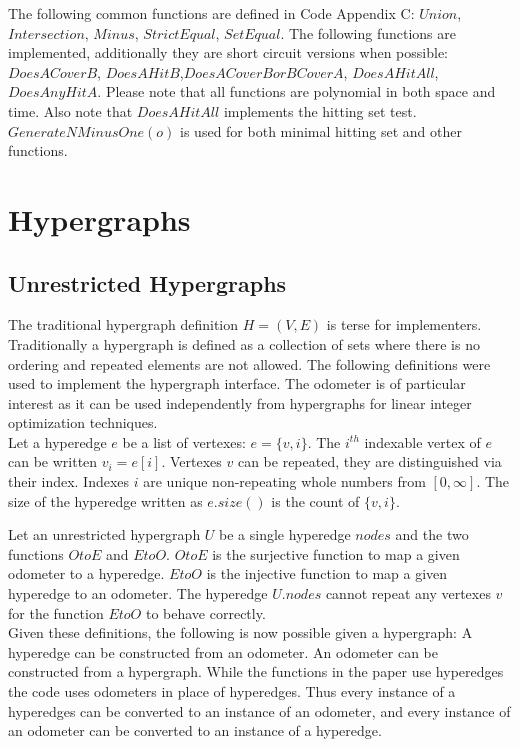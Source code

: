 The following common functions are defined in Code Appendix C: $Union$, $Intersection$, $Minus$, $StrictEqual$, $SetEqual$. The following functions are implemented, additionally they are short circuit versions when possible: $DoesACoverB$, $DoesAHitB$,$DoesACoverBorBCoverA$, $DoesAHitAll$, $DoesAnyHitA$. Please note that all functions are polynomial in both space and time. Also note that $DoesAHitAll$ implements the hitting set test. $GenerateNMinusOne(o)$ is used for both minimal hitting set and other functions.\\

\section{Hypergraphs}
\subsection{Unrestricted Hypergraphs}
The traditional hypergraph definition $H=(V,E)$ is terse for implementers. Traditionally a hypergraph is defined as a collection of sets where there is no ordering and repeated elements are not allowed. The following definitions were used  to implement the hypergraph interface. The odometer is of particular interest as it can be used independently from hypergraphs for linear integer optimization techniques.\\

Let a hyperedge $e$ be a list of vertexes: $e =\{v,i\}$. The $i^{th}$ indexable vertex of $e$ can be written $v_i = e[i]$. Vertexes $v$ can be repeated, they are distinguished via their index. Indexes $i$ are unique non-repeating whole numbers from $[0,\infty]$. The size of the hyperedge written as $e.size()$ is the count of $\{v,i\}$.


Let an unrestricted hypergraph $U$ be a single hyperedge $nodes$ and the two functions $OtoE$ and $EtoO$. $OtoE$ is the surjective function to map a given odometer to a hyperedge. $EtoO$ is the injective function to map a given hyperedge to an odometer. The hyperedge $U.nodes$ cannot repeat any vertexes $v$ for the function $EtoO$ to behave correctly. \\

Given these definitions, the following is now possible given a hypergraph: A hyperedge can be constructed from an odometer. An odometer can be constructed from a hypergraph. While the functions in the paper use hyperedges the code uses odometers in place of hyperedges. Thus every instance of a hyperedges can be converted to an instance of an odometer, and every instance of an odometer can be converted to an instance of a hyperedge.\\

